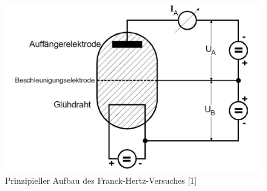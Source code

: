 	\begin{figure}[h]
		\begin{center}
		\includegraphics[scale=0.3]{picaufbaugrob.jpg}
		\caption{Prinzipieller Aufbau des Franck-Hertz-Versuches [1]}
		\label{picaufbaugrob}
		\end{center}	
	\end{figure}